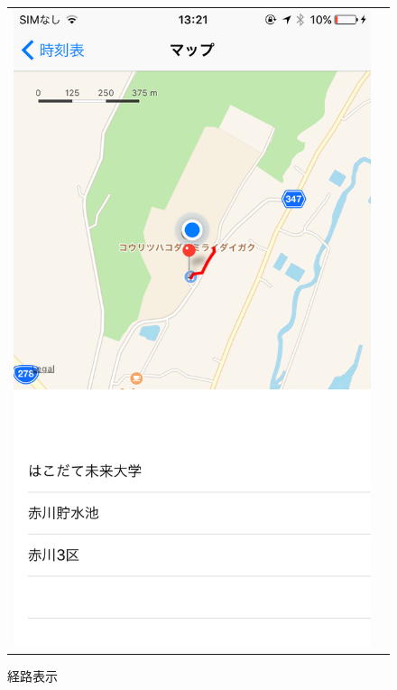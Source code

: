 \documentclass[openany,11pt,papersize]{jsbook}
\begin{document}
\begin{figure}[H]
\begin{tabular}{cc}
      \begin{minipage}[t]{0.45\hsize}
        \centering
        \includegraphics[keepaspectratio, scale=0.2]{img/root.png}
        \caption{経路表示}
        \label{fig:root}
      \end{minipage}\\
    \end{tabular}
  \end{figure}
\end{document}
